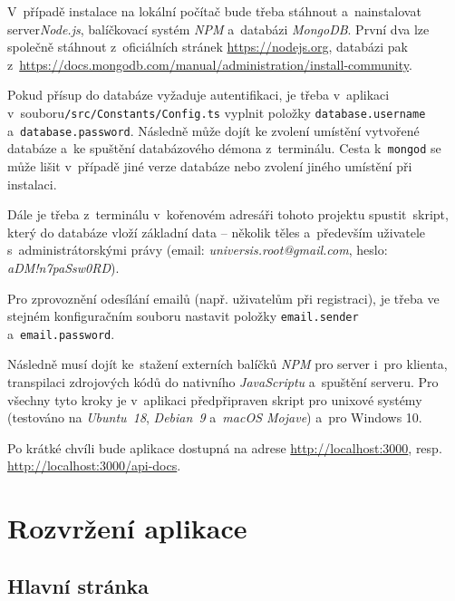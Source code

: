 \documentclass[a4paper,12pt]{article}
\def\code#1{\texttt{#1}}
\begin{document}
V~případě instalace na lokální počítač bude třeba stáhnout a~nainstalovat server\textit{Node.js}, balíčkovací systém \textit{NPM} a~databázi \textit{MongoDB}. První dva lze společně stáhnout z~oficiálních stránek \url{https://nodejs.org}, databázi pak z~\url{https://docs.mongodb.com/manual/administration/install-community}.

Pokud přísup do databáze vyžaduje autentifikaci, je třeba v~aplikaci v~souboru\break\code{/src/Constants/Config.ts} vyplnit položky \code{database.username} a~\code{database.password}. Následně může dojít ke zvolení umístění vytvořené databáze a~ke spuštění databázového démona z~terminálu. Cesta k~\code{mongod} se může lišit v~případě jiné verze databáze nebo zvolení jiného umístění při instalaci.



Dále je třeba z~terminálu v~kořenovém adresáři tohoto projektu spustit~skript, který do databáze vloží základní data -- několik těles a~především uživatele s~administrátorskými právy (email: \textit{universis.root@gmail.com}, heslo: \textit{aDM!n7paSsw0RD}).



Pro zprovoznění odesílání emailů (např. uživatelům při registraci), je třeba ve stejném konfiguračním souboru nastavit položky \code{email.sender} a~\code{email.password}.

Následně musí dojít ke~stažení externích balíčků \textit{NPM} pro server i~pro klienta, transpilaci zdrojových kódů do nativního \textit{JavaScriptu} a~spuštění serveru. Pro všechny tyto kroky je v~aplikaci předpřipraven skript pro unixové systémy (testováno na \textit{Ubuntu~18}, \textit{Debian~9} a~\textit{macOS Mojave}) a~pro Windows 10.



Po krátké chvíli bude aplikace dostupná na adrese \url{http://localhost:3000}, resp. \url{http://localhost:3000/api-docs}.

\section{Rozvržení aplikace}

\subsection{Hlavní stránka}
\end{document}
